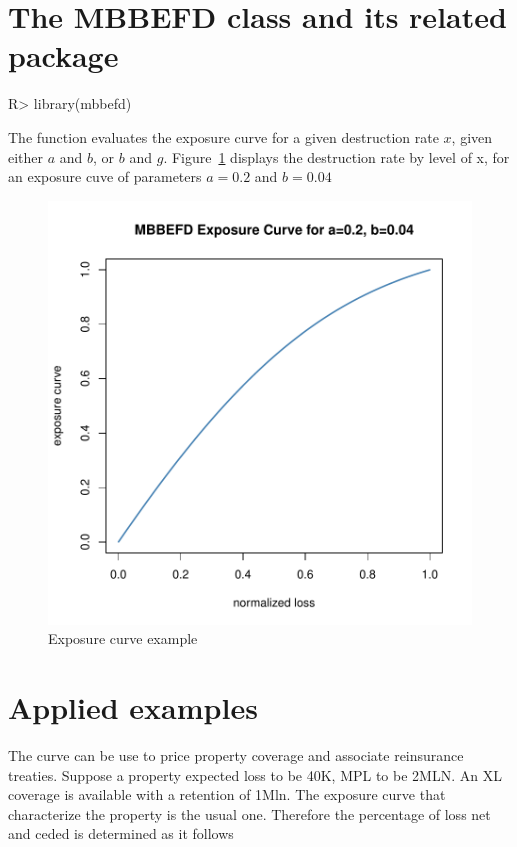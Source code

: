 \documentclass[nojss]{jss}
\begin{document}
\section{The MBBEFD class and its related package}\label{sec:package}

\begin{Schunk}
\begin{Sinput}
R> library(mbbefd)
\end{Sinput}
\end{Schunk}


The  function evaluates the exposure curve for a given destruction rate $x$, given either $a$ and $b$, or $b$ and $g$. Figure~\ref{fig:G1} displays the destruction rate by level of x, for an exposure cuve of parameters $a=0.2$ and $b=0.04$



\begin{figure}
\begin{center}
\includegraphics{mbbefd-drateplot}
\caption{Exposure curve example}
\label{fig:G1}
\end{center}
\end{figure}



\section{Applied examples}\label{sec:examples}
The curve can be use to price property coverage and associate reinsurance treaties. Suppose a property expected loss to be 40K, MPL to be 2MLN. An XL coverage is available with a retention of 1Mln. The exposure curve that characterize the property is the usual one. Therefore the percentage of loss net and ceded is determined as it follows
\end{document}
